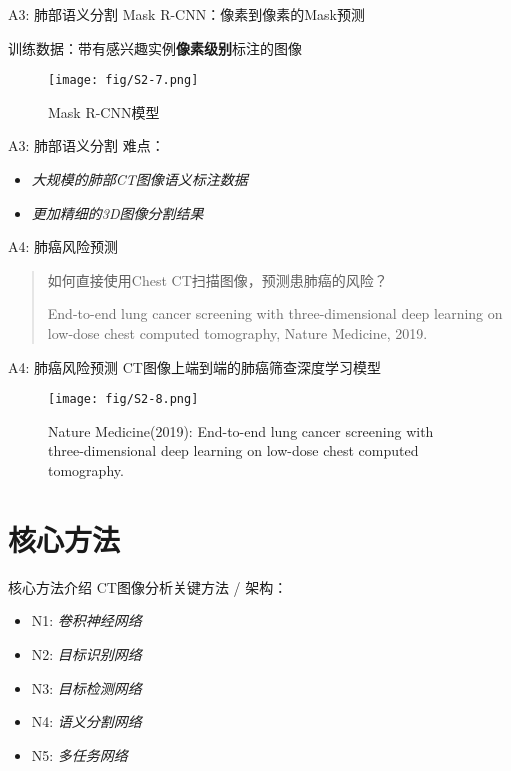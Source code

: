 \documentclass[10pt]{beamer}
\begin{document}
\begin{frame}{A3: 肺部语义分割}
  Mask R-CNN：像素到像素的Mask预测

  训练数据：带有感兴趣实例\textbf{像素级别}标注的图像
  \begin{figure}[htbp]
    \centering
    \texttt{[image: fig/S2-7.png]}
    \caption{Mask R-CNN模型}
  \end{figure}
\end{frame}

\begin{frame}{A3: 肺部语义分割}
  难点：
  \begin{itemize}
    \item \textit{大规模的肺部CT图像语义标注数据}
    \item \textit{更加精细的3D图像分割结果}
  \end{itemize}
\end{frame}

\begin{frame}{A4: 肺癌风险预测}
  \begin{quote}
    如何直接使用Chest CT扫描图像，预测患肺癌的风险？
    \vspace{5 mm}

    End-to-end lung cancer screening with three-dimensional deep learning on low-dose chest computed tomography, Nature Medicine, 2019.
  \end{quote}
\end{frame}

\begin{frame}{A4: 肺癌风险预测}
  CT图像上端到端的肺癌筛查深度学习模型

  \begin{figure}[htbp]
    \centering
    \texttt{[image: fig/S2-8.png]}
    \caption{Nature Medicine(2019): End-to-end lung cancer screening with three-dimensional deep learning on low-dose chest computed tomography.}
  \end{figure}
\end{frame}

\section{核心方法}

\begin{frame}{核心方法介绍}
  CT图像分析关键方法 / 架构：
  \begin{itemize}
    \item N1: \textit{卷积神经网络}
    \item N2: \textit{目标识别网络}
    \item N3: \textit{目标检测网络}
    \item N4: \textit{语义分割网络}
    \item N5: \textit{多任务网络}
  \end{itemize}
\end{frame}
\end{document}
